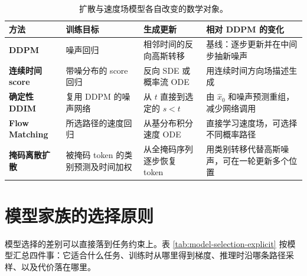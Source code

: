 \begin{table}[H]
\centering\small
\begin{tabularx}{\textwidth}{>{\bfseries}p{28mm} X X X}
\toprule
方法 & 训练目标 & 生成更新 & 相对 DDPM 的变化\\
\midrule
DDPM & 噪声回归 & 相邻时间的反向高斯转移 & 基线：逐步更新并在中间步抽新噪声\\
连续时间 score & 带噪分布的 score 回归 & 反向 SDE 或概率流 ODE & 用连续时间方向场描述生成\\
确定性 DDIM & 复用 DDPM 的噪声网络 & 从 \(t\) 直接到选定的 \(s<t\) & 由 \(\hat x_0\) 和噪声预测重组，减少网络调用\\
Flow Matching & 所选路径的速度回归 & 从基分布积分速度 ODE & 直接学习速度场，可选择不同概率路径\\
掩码离散扩散 & 被掩码 token 的类别预测及时间加权 & 从全掩码序列逐步恢复 token & 用类别转移代替高斯噪声，可在一轮更新多个位置\\
\bottomrule
\end{tabularx}
\caption{扩散与速度场模型各自改变的数学对象。}
\label{tab:diffusion-score-variants}
\end{table}

\section{模型家族的选择原则}

模型选择的差别可以直接落到任务约束上。表 \ref{tab:model-selection-explicit} 按模型汇总四件事：它适合什么任务、训练时从哪里得到梯度、推理时沿哪条路径采样、以及代价落在哪里。

